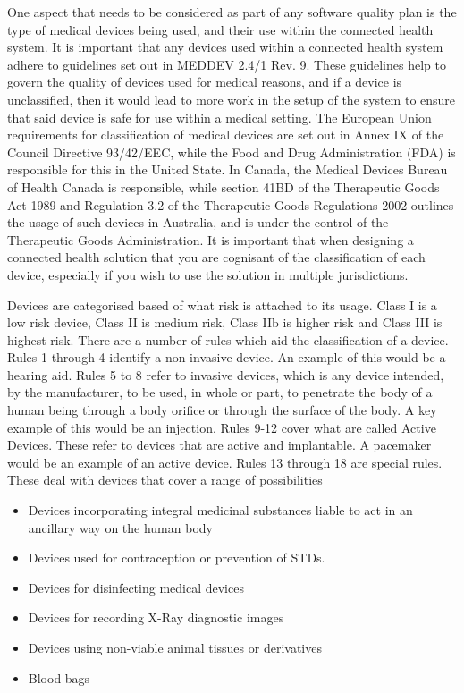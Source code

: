 One aspect that needs to be considered as part of any software quality plan is the type of medical devices being used, and their use within the connected health system. It is important that any devices used within a connected health system adhere to guidelines set out in MEDDEV 2.4/1 Rev. 9. These guidelines help to govern the quality of devices used for medical reasons, and if a device is unclassified, then it would lead to more work in the setup of the system to ensure that said device is safe for use within a medical setting. The European Union requirements for classification of medical devices are set out in Annex IX of the Council Directive 93/42/EEC, while the Food and Drug Administration (FDA) is responsible for this in the United State. In Canada, the Medical Devices Bureau of Health Canada is responsible, while section 41BD of the Therapeutic Goods Act 1989 and Regulation 3.2 of the Therapeutic Goods Regulations 2002 outlines the usage of such devices in Australia, and is under the control of the Therapeutic Goods Administration. It is important that when designing a connected health solution that you are cognisant of the classification of each device, especially if you wish to use the solution in multiple jurisdictions. 

Devices are categorised based of what risk is attached to its usage. Class I is a low risk device, Class II is medium risk, Class IIb is higher risk and Class III is highest risk. There are a number of rules which aid the classification of a device. Rules 1 through 4 identify a non-invasive device. An example of this would be a hearing aid. Rules 5 to 8 refer to invasive devices, which is any device intended, by the manufacturer, to be used, in whole or part, to penetrate the body of a human being through a body orifice or through the surface of the body. A key example of this would be an injection. Rules 9-12 cover what are called Active Devices. These refer to devices that are active and implantable. A pacemaker would be an example of an active device. Rules 13 through 18 are special rules. These deal with devices that cover a range of possibilities

\begin{itemize}
\item Devices incorporating integral medicinal substances liable to act in an ancillary way on the human body
\item Devices used for contraception or prevention of STDs.
\item Devices for disinfecting medical devices
\item Devices for recording X-Ray diagnostic images
\item Devices using non-viable animal tissues or derivatives
\item Blood bags
\end{itemize}

